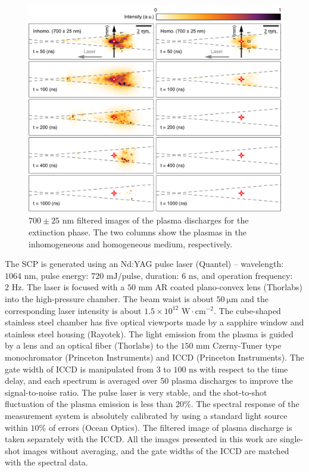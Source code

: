 \begin{figure}[ht!]
\centering
\includegraphics[width=130mm]{figures/ch4/imaging/700ext.pdf}
\caption{$700\pm25 \text{ nm}$ filtered images of the plasma discharges for the extinction phase. The two columns show the plasmas in the inhomogeneous and homogeneous medium, respectively.}
\label{fig:700ext}
\end{figure}

The SCP is generated using an Nd:YAG pulse laser (Quantel) –  wavelength: $1064 \text{ nm}$, pulse energy: $720 \text{ mJ/pulse}$, duration: $6 \text{ ns}$, and operation frequency: $2 \text{ Hz}$. The laser is focused with a $50 \text{ mm}$ AR coated plano-convex lens (Thorlabs) into the high-pressure chamber. The beam waist is about $50 ~\mathrm{\mu}\text{m}$ and the corresponding laser intensity is about $1.5 \times 10^{12} \text{ W}\cdot\text{cm}^{-2}$. The cube-shaped stainless steel chamber has five optical viewports made by a sapphire window and stainless steel housing (Rayotek). The light emission from the plasma is guided by a lens and an optical fiber (Thorlabs) to the $150 \text{ mm}$ Czerny-Tuner type monochromator (Princeton Instruments) and ICCD (Princeton Instruments). The gate width of ICCD is manipulated from $3$ to $100 \text{ ns}$ with respect to the time delay, and each spectrum is averaged over 50 plasma discharges to improve the signal-to-noise ratio. The pulse laser is very stable, and the shot-to-shot fluctuation of the plasma emission is less than $20\%$. The spectral response of the measurement system is absolutely calibrated by using a standard light source within $10\%$ of errors (Ocean Optics). The filtered image of plasma discharge is taken separately with the ICCD. All the images presented in this work are single-shot images without averaging, and the gate widths of the ICCD are matched with the spectral data.



